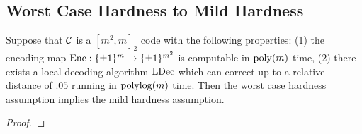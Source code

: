 \documentclass[11pt]{article}
\begin{document}
\subsection{Worst Case Hardness to Mild Hardness}

\begin{theorem}{2.6}\label{t-2-6}
    Suppose that $\mathcal{C}$ is a $[m^2, m]_2$ code with the following properties: (1) the encoding map $\mathrm{Enc} : \{\pm 1\}^m \rightarrow \{\pm 1\}^{m^2}$ is computable in $\mathrm{poly}(m)$ time, (2) there exists a local decoding algorithm ${\textup{LDec}}$ which can correct up to a relative distance of $.05$ running in $\mathrm{polylog}(m)$ time. Then the worst case hardness assumption implies the mild hardness assumption.
\end{theorem}

\begin{proof}


\end{proof}
\end{document}
